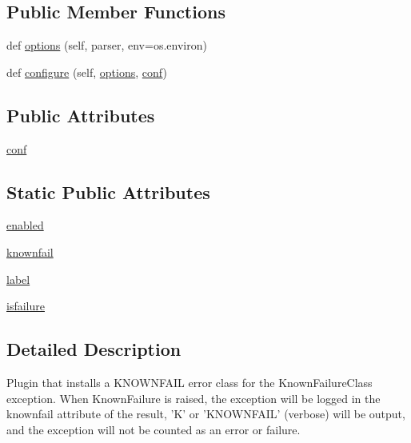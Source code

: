 \subsection*{Public Member Functions}
\begin{DoxyCompactItemize}
\item 
def \hyperlink{classnumpy_1_1testing_1_1__private_1_1noseclasses_1_1KnownFailurePlugin_a3a17d6b9ad0bf6548e1c46df720be880}{options} (self, parser, env=os.\+environ)
\item 
def \hyperlink{classnumpy_1_1testing_1_1__private_1_1noseclasses_1_1KnownFailurePlugin_a6c012f5a3fb73c697bbec5d1f6b1af69}{configure} (self, \hyperlink{classnumpy_1_1testing_1_1__private_1_1noseclasses_1_1KnownFailurePlugin_a3a17d6b9ad0bf6548e1c46df720be880}{options}, \hyperlink{classnumpy_1_1testing_1_1__private_1_1noseclasses_1_1KnownFailurePlugin_ade49e94413a37f9aae2880af061486e1}{conf})
\end{DoxyCompactItemize}
\subsection*{Public Attributes}
\begin{DoxyCompactItemize}
\item 
\hyperlink{classnumpy_1_1testing_1_1__private_1_1noseclasses_1_1KnownFailurePlugin_ade49e94413a37f9aae2880af061486e1}{conf}
\end{DoxyCompactItemize}
\subsection*{Static Public Attributes}
\begin{DoxyCompactItemize}
\item 
\hyperlink{classnumpy_1_1testing_1_1__private_1_1noseclasses_1_1KnownFailurePlugin_a6e0d42939826076449f361a937fa296f}{enabled}
\item 
\hyperlink{classnumpy_1_1testing_1_1__private_1_1noseclasses_1_1KnownFailurePlugin_a33783da6f36e581beb0f3f40a8e1a716}{knownfail}
\item 
\hyperlink{classnumpy_1_1testing_1_1__private_1_1noseclasses_1_1KnownFailurePlugin_aa9827edcabf6ea7560bbc79218f26284}{label}
\item 
\hyperlink{classnumpy_1_1testing_1_1__private_1_1noseclasses_1_1KnownFailurePlugin_a33b81805a9c7988c32a4689c68277baa}{isfailure}
\end{DoxyCompactItemize}


\subsection{Detailed Description}
\begin{DoxyVerb}Plugin that installs a KNOWNFAIL error class for the
KnownFailureClass exception.  When KnownFailure is raised,
the exception will be logged in the knownfail attribute of the
result, 'K' or 'KNOWNFAIL' (verbose) will be output, and the
exception will not be counted as an error or failure.\end{DoxyVerb}
 

